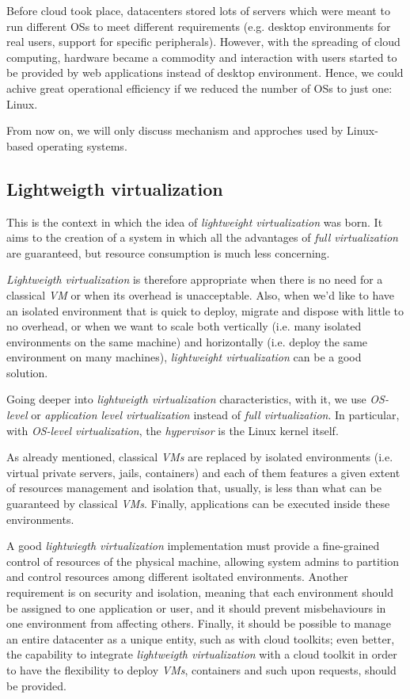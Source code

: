 \bigskip\noindent
Before cloud took place, datacenters stored lots of servers which were meant to
run different OSs to meet different requirements (e.g. desktop environments for
real users, support for specific peripherals). However, with the spreading of
cloud computing, hardware became a commodity and interaction with users started
to be provided by web applications instead of desktop environment. Hence, we
could achive great operational efficiency if we reduced the number of OSs to
just one: Linux.

\begin{note}
    From now on, we will only discuss mechanism and approches used by Linux-based
    operating systems.
\end{note}

\subsection{Lightweigth virtualization}
This is the context in which the idea of \emph{lightweight virtualization} was
born. It aims to the creation of a system in which all the advantages of \emph{full
virtualization} are guaranteed, but resource consumption is much less concerning.

\emph{Lightweigth virtualization} is therefore appropriate when there is no need
for a classical \emph{VM} or when its overhead is unacceptable. Also, when we'd like to
have an isolated environment that is quick to deploy, migrate and dispose with
little to no overhead, or when we want to scale both vertically (i.e. many
isolated environments on the same machine) and horizontally (i.e. deploy the
same environment on many machines), \emph{lightweight virtualization} can be a
good solution.

\bigskip\noindent
Going deeper into \emph{lightweigth virtualization} characteristics, with it,
we use \emph{OS-level} or \emph{application level virtualization} instead of
\emph{full virtualization}. In particular, with \emph{OS-level virtualization},
the \emph{hypervisor} is the Linux kernel itself.

As already mentioned, classical \emph{VMs} are replaced by isolated environments
(i.e. virtual private servers, jails, containers) and each of them features a
given extent of resources management and isolation that, usually, is less than
what can be guaranteed by classical \emph{VMs}. Finally, applications can be executed
inside these environments.

A good \emph{lightwiegth virtualization} implementation must provide a
fine-grained control of resources of the physical machine, allowing system
admins to partition and control resources among different isoltated environments.
Another requirement is on security and isolation, meaning that each environment
should be assigned to one application or user, and it should prevent misbehaviours in
one environment from affecting others. Finally, it should be possible to manage
an entire datacenter as a unique entity, such as with cloud toolkits; even better,
the capability to integrate \emph{lightweigth virtualization} with a cloud
toolkit in order to have the flexibility to deploy \emph{VMs}, containers and such
upon requests, should be provided.

